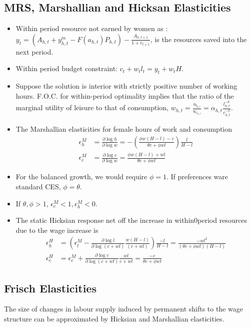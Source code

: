 \subsection{MRS, Marshallian and Hicksan Elasticities}
\begin{itemize}
    \item  Within period resource not earned by women as : $y_t = (A_{h,t} + y_{h,t}^m - F(a_{h,t}) P_{h,t}) - \frac{A_{h,t+1}}{1 + r_{t+1}}$, is the resources saved into the next period.
     \item Within period budget constraint: $c_t + w_t l_t = y_t + w_t H$.
     \item Suppose the solution is interior with strictly positive number of working hours. F.O.C. for within-period optimality implies that the ratio of the marginal utility of leisure to that of consumption,
     $w_{h,t} = \frac{u_{l_{h,t}}}{u_{c_{h,t}}} = \alpha_{h,t} \frac{l_{h,t}^{-\theta}}{c_{h,t}^{-\phi}}$.
     \item The Marshallian elasticities for female hours of work and consumption \[ \begin{split}
      \epsilon_h^M & = \frac{\partial \log h}{\partial \log w} = - \left( \frac{\phi w (H-l) - c}{\theta c + \phi w l} \right) \frac{l}{H - l } \\
      \epsilon_c^M & = \frac{\partial \log c}{\partial \log w} = \frac{\phi w (H-l) + wl}{\theta c + \phi w l} \end{split}\]
      \item For the balanced growth, we would require $\phi = 1$. If preferences ware standard CES, $\phi = \theta$.\item If $\theta,\phi > 1$, $\epsilon^M_c < 1,\epsilon_h^M <  0 $.
      \item The static Hicksian response net off the increase in within0period resources due to the wage increase is \[ \begin{split}
          \epsilon_h^H & = \left(\epsilon_l^M - \frac{\partial \log l }{\partial \log (c+wl)} \frac{w(H-l)}{(c+wl)}\right)\frac{-l}{H-l} = \frac{-wl^2}{(\theta c + \phi w l )(H - l)} \\
          \epsilon_c^H & = \epsilon_c^M + \frac{\partial \log c}{\partial \log (c+wl)} \frac{wl}{c+wl} = \frac{-c}{\theta c  + \phi wl}
      \end{split} \]
\end{itemize}

\subsection{Frisch Elasticities}
The size of changes in labour supply induced by permanent shifts to the wage structure can be approximated by Hicksian and Marshallian elasticities.

